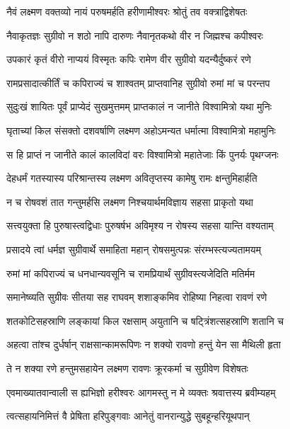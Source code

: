 \twolineshloka
{नैवं लक्ष्मण वक्तव्यो नायं परुषमर्हति}
{हरीणामीश्वरः श्रोतुं तव वक्त्राद्विशेषतः} %

\twolineshloka
{नैवाकृतज्ञः सुग्रीवो न शठो नापि दारुणः}
{नैवानृतकथो वीर न जिह्मश्च कपीश्वरः} %

\twolineshloka
{उपकारं कृतं वीरो नाप्ययं विस्मृतः कपिः}
{रामेण वीर सुग्रीवो यदन्यैर्दुष्करं रणे} %

\twolineshloka
{रामप्रसादात्कीर्तिं च कपिराज्यं च शाश्वतम्}
{प्राप्तवानिह सुग्रीवो रुमां मां च परन्तप} %

\twolineshloka
{सुदुःखं शायितः पूर्वं प्राप्येदं सुखमुत्तमम्}
{प्राप्तकालं न जानीते विश्वामित्रो यथा मुनिः} %

\twolineshloka
{घृताच्यां किल संसक्तो दशवर्षाणि लक्ष्मण}
{अहोऽमन्यत धर्मात्मा विश्वामित्रो महामुनिः} %

\twolineshloka
{स हि प्राप्तं न जानीते कालं कालविदां वरः}
{विश्वामित्रो महातेजाः किं पुनर्यः पृथग्जनः} %

\twolineshloka
{देहधर्मं गतस्यास्य परिश्रान्तस्य लक्ष्मण}
{अवितृप्तस्य कामेषु रामः क्षन्तुमिहार्हति} %

\twolineshloka
{न च रोषवशं तात गन्तुमर्हसि लक्ष्मण}
{निश्चयार्थमविज्ञाय सहसा प्राकृतो यथा} %

\twolineshloka
{सत्त्वयुक्ता हि पुरुषास्त्वद्विधाः पुरुषर्षभ}
{अविमृश्य न रोषस्य सहसा यान्ति वश्यताम्} %

\twolineshloka
{प्रसादये त्वां धर्मज्ञ सुग्रीवार्थे समाहिता}
{महान् रोषसमुत्पन्नः संरम्भस्त्यज्यतामयम्} %

\twolineshloka
{रुमां मां कपिराज्यं च धनधान्यवसूनि च}
{रामप्रियार्थं सुग्रीवस्त्यजेदिति मतिर्मम} %

\twolineshloka
{समानेष्व्यति सुग्रीवः सीतया सह राघवम्}
{शशाङ्कमिव रोहिष्या निहत्वा रावणं रणे} %

\twolineshloka
{शतकोटिसहस्राणि लङ्कायां किल रक्षसाम्}
{अयुतानि च षट्त्रिंशत्सहस्राणि शतानि च} %

\twolineshloka
{अहत्वा तांश्च दुर्धर्षान् राक्षसान्कामरूपिणः}
{न शक्यो रावणो हन्तुं येन सा मैथिली हृता} %

\twolineshloka
{ते न शक्या रणे हन्तुमसहायेन लक्ष्मण}
{रावणः क्रूरकर्मा च सुग्रीवेण विशेषतः} %

\twolineshloka
{एवमाख्यातवान्वाली स ह्यभिज्ञो हरीश्वरः}
{आगमस्तु न मे व्यक्तः श्रवात्तस्य ब्रवीम्यहम्} %

\twolineshloka
{त्वत्सहायनिमित्तं वै प्रेषिता हरिपुङ्गवाः}
{आनेतुं वानरान्युद्धे सुबहून्हरियूथपान्} %

